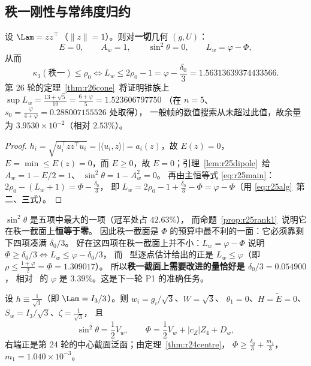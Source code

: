 \subsection{秩一刚性与常纬度归约}\label{sec:r25:rigid}

\begin{proposition}[秩一截面的刚性]\label{prop:r25rank1}
设 $\Lam=zz^\top$（$\|z\|=1$）。则对\textbf{一切}几何 $(g,U)$：
\begin{equation}\label{eq:r25r1}
E=0,\qquad A_w=1,\qquad \sin^2\theta=0,\qquad L_w=\varphi-\Phi ,
\end{equation}
从而
\begin{equation}\label{eq:r25r2}
\kappa_3(\text{秩一})\le\rho_0\iff
L_w\le2\rho_0-1=\varphi-\frac{\delta_0}3=1.56313639374433566 .
\end{equation}
第 26 轮的定理~\ref{thm:r26cone}~将证明锥族上
$\sup L_w=\frac{13+\sqrt5}{10}=\frac{6+\varphi}5=1.523606797750$
（在 $n=5$、$s_0=\frac{\varphi}{4+\varphi}=0.288007155526$ 处取得），
一般帧的数值搜索从未超过此值，故余量为 $3.9530\times10^{-2}$（相对 $2.53\%$）。
\end{proposition}

\begin{proof}
$h_i=\sqrt{u_i^\top zz^\top u_i}=|\langle u_i,z\rangle|=a_i(z)$，故 $E(z)=0$，
$E=\min\le E(z)=0$，而 $E\ge0$，故 $E=0$；引理~\ref{lem:r25dipole}~给 $A_w=1-E/2=1$、
$\sin^2\theta=1-A_w^2=0$。
再由主恒等式 \eqref{eq:r25main}：$2\rho_0-(L_w+1)=\Phi-\frac{\delta_0}3$，
即 $L_w=2\rho_0-1+\frac{\delta_0}3-\Phi=\varphi-\Phi$（用 \eqref{eq:r25alg}~第二、三式）。
\end{proof}

\begin{remark}[秩一截面为何是「最坏」的]\label{rem:r25rank1}
$\sin^2\theta$ 是五项中最大的一项（冠军处占 $42.63\%$），
而命题~\ref{prop:r25rank1}~说明它在秩一截面上\textbf{恒等于零}。
因此秩一截面是 $\Phi$ 的预算中最不利的一面：它必须靠剩下四项凑满 $\delta_0/3$。
好在这四项在秩一截面上并不小：$L_w=\varphi-\Phi$ 说明
$\Phi\ge\delta_0/3\iff L_w\le\varphi-\delta_0/3$，
而 \STW\ 型逐点估计给出的正是 $L_w\le\varphi$（即 $\rho\le\frac{1+\varphi}2=\Phi=1.309017$）。
所以\textbf{秩一截面上需要改进的量恰好是 $\delta_0/3=0.054900$}，
相对 \STW\ 的 $\varphi$ 是 $3.39\%$。这是下一轮 P1 的准确任务。
\end{remark}

\begin{proposition}[常纬度归约到第 24 轮]\label{prop:r25lat}
设 $h\equiv\frac1{\sqrt3}$（即 $\Lam=I_3/3$）。则 $w_i=g_i/\sqrt3$、$W=\sqrt3$、
$\theta_1=0$、$H=\widetilde E=0$、$S_w=I_3/\sqrt3$、$\zeta=\frac1{\sqrt3}$，
且
\begin{equation}\label{eq:r25lat}
\sin^2\theta=\frac12V_w,\qquad
\Phi=\frac12V_w+|c_Z|Z_4+D_w ,
\end{equation}
右端正是第 24 轮的中心截面泛函；由定理~\ref{thm:r24centre}，
$\Phi\ge\frac{\delta_0}3+\frac{m_1}3$，$m_1=1.040\times10^{-3}$。
\end{proposition}

